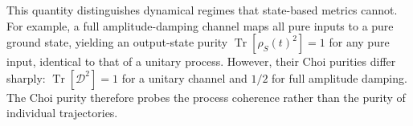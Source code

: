 \documentclass[pra,twocolumn,aps,showpacs,superscriptaddress,longbibliography]{revtex4-2}%
\providecommand{\DIFaddend}{} %
\providecommand{\DIFdelbegin}{} %
\begin{document}
\DIFaddend %
This quantity distinguishes dynamical regimes that state-based metrics cannot. For example, a full amplitude-damping channel maps all pure inputs to a pure ground state, yielding an output-state purity $\operatorname{Tr}[\rho_S(t)^2]=1$ for any pure input, identical to that of a unitary process. However, their Choi purities differ sharply: $\operatorname{Tr}[\mathcal{D}^2]=1$ for a unitary channel and $1/2$ for full amplitude damping. The Choi purity therefore probes the process coherence rather than the purity of individual trajectories.

\DIFdelbegin %

\end{document}
